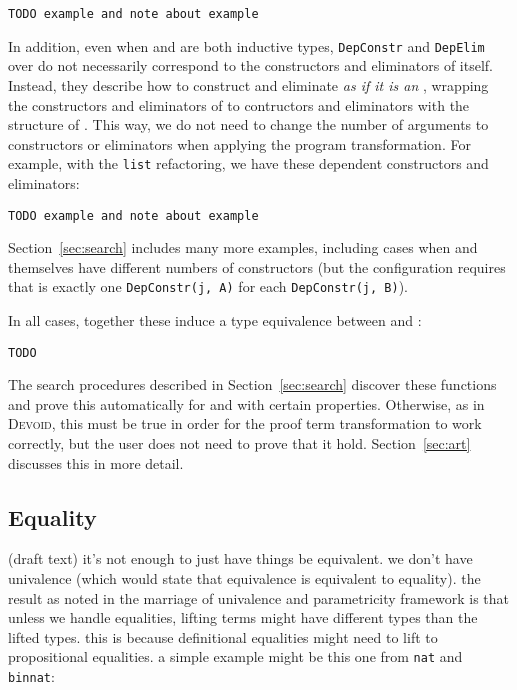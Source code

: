 \begin{lstlisting}
TODO example and note about example
\end{lstlisting}

In addition, even when \A and \B are both inductive types,
\lstinline{DepConstr} and \lstinline{DepElim} over \B do not necessarily correspond
to the constructors and eliminators of \B itself.
Instead, they describe how to construct and eliminate \B \textit{as if it is an \A},
wrapping the constructors and eliminators of \B to contructors and eliminators with the
structure of \A.
This way, we do not need to change the number of arguments to constructors or eliminators when applying the program transformation.
For example, with the \lstinline{list} refactoring, we have these dependent constructors and eliminators:

\begin{lstlisting}
TODO example and note about example
\end{lstlisting}
Section~\ref{sec:search} includes many more examples, including cases when \A and \B
themselves have different numbers of constructors (but the configuration requires that
is exactly one \lstinline{DepConstr(j, A)} for each \lstinline{DepConstr(j, B)}).

In all cases, together these induce a type equivalence between \A and \B:

\begin{lstlisting}
TODO
\end{lstlisting}
The search procedures described in Section~\ref{sec:search} discover these functions and prove this automatically
for \A and \B with certain properties.
Otherwise, as in \textsc{Devoid}, this must be true in order for the proof term transformation
to work correctly, but the user does not need to prove that it hold.
Section~\ref{sec:art} discusses this in more detail.

\subsection{Equality}
\label{sec:equality}

(draft text) it's not enough to just have things be equivalent.
we don't have univalence (which would state that equivalence is equivalent to equality).
the result as noted in the marriage of univalence and parametricity framework is that unless we handle equalities,
lifting terms might have different types than the lifted types.
this is because definitional equalities might need to lift to propositional equalities.
a simple example might be this one from \lstinline{nat} and \lstinline{binnat}:

